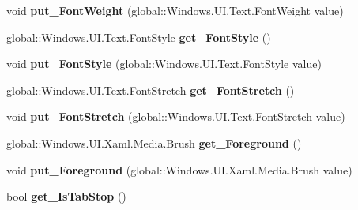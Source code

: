 \begin{DoxyCompactItemize}
void {\bfseries put\+\_\+\+Font\+Weight} (global\+::\+Windows.\+U\+I.\+Text.\+Font\+Weight value)
\item 
\mbox{\label{interface_windows_1_1_u_i_1_1_xaml_1_1_controls_1_1_i_control_a3e1d85a4f0fe3ee8c4cff3ce4f34a651}} 
global\+::\+Windows.\+U\+I.\+Text.\+Font\+Style {\bfseries get\+\_\+\+Font\+Style} ()
\item 
\mbox{\label{interface_windows_1_1_u_i_1_1_xaml_1_1_controls_1_1_i_control_ae53a72ae88bd4e1f7d417580689134f9}} 
void {\bfseries put\+\_\+\+Font\+Style} (global\+::\+Windows.\+U\+I.\+Text.\+Font\+Style value)
\item 
\mbox{\label{interface_windows_1_1_u_i_1_1_xaml_1_1_controls_1_1_i_control_a228e9d117d9f71834ef119f7e646e5ac}} 
global\+::\+Windows.\+U\+I.\+Text.\+Font\+Stretch {\bfseries get\+\_\+\+Font\+Stretch} ()
\item 
\mbox{\label{interface_windows_1_1_u_i_1_1_xaml_1_1_controls_1_1_i_control_ad35a998ea47ff36b5d343fadbc164608}} 
void {\bfseries put\+\_\+\+Font\+Stretch} (global\+::\+Windows.\+U\+I.\+Text.\+Font\+Stretch value)
\item 
\mbox{\label{interface_windows_1_1_u_i_1_1_xaml_1_1_controls_1_1_i_control_a47d44a65491cf9594c0e06bb0f5f2d81}} 
global\+::\+Windows.\+U\+I.\+Xaml.\+Media.\+Brush {\bfseries get\+\_\+\+Foreground} ()
\item 
\mbox{\label{interface_windows_1_1_u_i_1_1_xaml_1_1_controls_1_1_i_control_a6a0ed2bdfead49d6dd9e637cc2a53e1a}} 
void {\bfseries put\+\_\+\+Foreground} (global\+::\+Windows.\+U\+I.\+Xaml.\+Media.\+Brush value)
\item 
\mbox{\label{interface_windows_1_1_u_i_1_1_xaml_1_1_controls_1_1_i_control_a20a0b52e3d736f000750ae5521ff5331}} 
bool {\bfseries get\+\_\+\+Is\+Tab\+Stop} ()
\item 

\end{DoxyCompactItemize}
